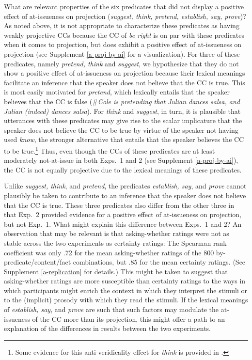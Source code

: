 \documentclass[11pt,fleqn]{article}
\newcommand{\6}{\mbox{$[\hspace*{-.6mm}[$}}
\newcommand{\9}{\mbox{$]\hspace*{-.6mm}]$}}
\begin{document}
What are relevant properties of the six predicates that did not display a positive effect of at-issueness on projection (\emph{suggest, think, pretend, establish, say, prove})? As noted above, it is not appropriate to characterize these predicates as having weakly projective CCs because the CC of {\em be right} is on par with these predicates when it comes to projection, but does exhibit a positive effect of at-issueness on projection (see Supplement \ref{a-proj-by-ai} for a visualization). For three of these predicates, namely \emph{pretend, think} and \emph{suggest}, we hypothesize that they do not show a positive effect of at-issueness on projection because their lexical meanings facilitate an inference that the speaker does not believe that the CC is true. This is most easily motivated for {\em pretend}, which lexically entails that the speaker believes that the CC is false (\#\emph{Cole is pretending that Julian dances salsa, and Julian (indeed) dances salsa}). For \emph{think} and {\em suggest}, in turn, it is plausible that utterances with these predicates may give rise to the scalar implicature that the speaker does not believe the CC to be true by virtue of the speaker not having used \emph{know}, the stronger alternative that entails that the speaker believes the CC to be true.\footnote{Some evidence for this anti-veridicality effect for \emph{think} is provided in \cite{pan-degen2023}.} Thus, even though the CCs of these predicates are at least moderately not-at-issue in both Exps.~1 and 2 (see Supplement \ref{a-proj-by-ai}), the CC is not equally projective due to the lexical meanings of these predicates.

Unlike \emph{suggest, think}, and \emph{pretend}, the predicates \emph{establish, say}, and \emph{prove} cannot plausibly be taken to contribute to an inference that the speaker does not believe that the CC is true. These three predicates also differ from the other three in that Exp.~2 provided evidence for a positive effect of at-issueness on projection, but not Exp.~1. What might explain this difference between Exps.~1 and 2? An observation that may be relevant is that asking-whether ratings were not as stable across the two experiments as certainty ratings: The Spearman rank coefficient was only .72 for the mean asking-whether ratings of the 800 by-predicate/content/fact combinations, but .85 for the mean certainty ratings. (See Supplement \ref{a-replication} for details.) This might be taken to suggest that asking-whether ratings are more susceptible than certainty ratings to the ways in which participants might enrich the context in which they interpret the stimuli or to the (implicit) prosody with which they read the stimuli. If the lexical meanings of \emph{establish, say}, and \emph{prove} are such that such factors may modulate the at-issueness of the CC more than its projection, this might offer a path to an explanation of the differences in results between the two experiments.  
\end{document}
